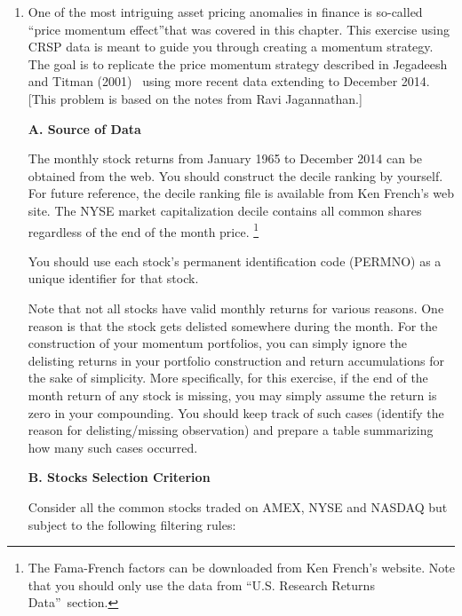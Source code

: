 \begin{enumerate}[1.]
\item One of the most intriguing asset pricing anomalies in finance is so-called
\textquotedblleft price momentum effect\textquotedblright that was covered in this chapter. This exercise using CRSP data is meant to guide you through
creating a momentum strategy. The goal is to replicate the price momentum
strategy described in Jegadeesh and Titman (2001)~\cite{JeTi} using more recent data
extending to December 2014. [This problem is based on the notes from Ravi Jagannathan.]
\hfill
\par\vspace{\baselineskip}
\textbf{A. Source of Data}
\hfill
\par\vspace{\baselineskip}
The monthly stock returns from January 1965 to December 2014 can be obtained from the web. You should construct the decile ranking by yourself. For future reference, the decile ranking file is available from Ken French's web site. The NYSE market capitalization decile contains all common shares regardless of the end of the month price.%
\footnote{%
The Fama-French factors can be downloaded from
Ken French's website. Note that you should only use the data from
\textquotedblleft U.S. Research Returns Data\textquotedblright\ section.}


You should use each stock's permanent identification code (PERMNO) as
a unique identifier for that stock.

Note that not all stocks have valid monthly returns for various reasons. One
reason is that the stock gets delisted somewhere during the month. For the
construction of your momentum portfolios, you can simply ignore the
delisting returns in your portfolio construction and return accumulations
for the sake of simplicity. More specifically, for this exercise, if the
end of the month return of any stock is missing, you may simply assume the
return is zero in your compounding. You should keep track of such
cases (identify the reason for delisting/missing observation) and prepare a
table summarizing how many such cases occurred.
\hfill
\par\vspace{\baselineskip}
\textbf{B. Stocks Selection Criterion}
\hfill
\par\vspace{\baselineskip}
Consider all the common stocks traded on AMEX, NYSE and NASDAQ but
subject to the following filtering rules:


\end{enumerate}
